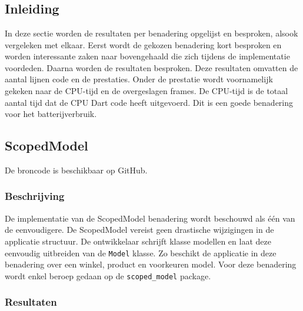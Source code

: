 

\chapter{}
\label{ch:experiment}

\section{Inleiding}
In deze sectie worden de resultaten per benadering opgelijst en besproken, alsook vergeleken met elkaar. Eerst wordt de gekozen benadering kort besproken en worden interessante zaken naar bovengehaald die zich tijdens de implementatie voordeden. Daarna worden de resultaten besproken. Deze resultaten omvatten de aantal lijnen code en de prestaties. \newline \newline Onder de prestatie wordt voornamelijk gekeken naar de CPU-tijd en de overgeslagen frames. De CPU-tijd is de totaal aantal tijd dat de CPU Dart code heeft uitgevoerd. Dit is een goede benadering voor het batterijverbruik.


\section{ScopedModel}
De broncode is beschikbaar op GitHub. \autocite{DeVrient2019a}
\subsection{Beschrijving}
De implementatie van de ScopedModel benadering wordt beschouwd als één van de eenvoudigere. De ScopedModel vereist geen drastische wijzigingen in de applicatie structuur. De ontwikkelaar schrijft klasse modellen en laat deze eenvoudig uitbreiden van de \verb|Model| klasse. Zo beschikt de applicatie in deze benadering over een winkel, product en voorkeuren model. \newline \newline
Voor deze benadering wordt enkel beroep gedaan op de \verb|scoped_model| package. 


\subsection{Resultaten}
